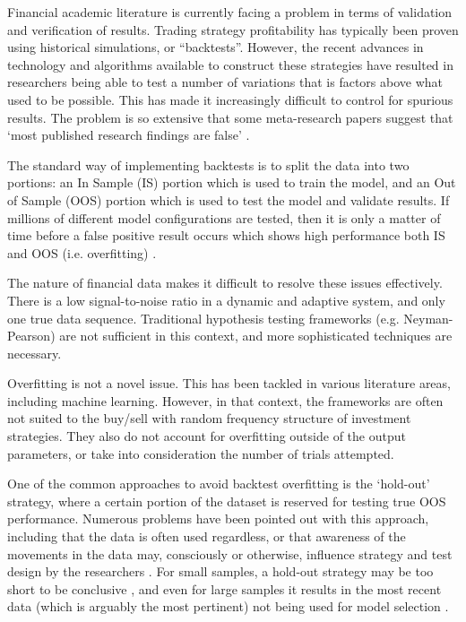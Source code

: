 \documentclass[a4paper,11pt,oneside]{article}
\theoremstyle{plain}
\theoremstyle{definition}
\begin{document}
	Financial academic literature is currently facing a problem in terms of validation and verification of results. 
	Trading strategy profitability has typically been proven using historical simulations, or 
	``backtests''. However, 
	the recent advances in technology and algorithms available 
	to construct these strategies have resulted in researchers being able to test a number of variations that is factors 
	above what used to be possible. This has made it increasingly difficult to control for spurious results. 
	The problem is so extensive that some meta-research papers suggest that ‘most published research findings are false’ \citep{Ioannidis}.
	\hfill \break 
	
	The standard way of implementing backtests is to split the data into two portions: an In Sample (IS) portion which
	is used to train the model, and an Out of Sample (OOS) portion which is used to test the model and validate results. 
	If millions of different model configurations are tested, then it is only a matter of time before a false positive result occurs which shows high performance both IS and OOS (i.e. overfitting) \citep{BailyPBO, McLean}. 
	\hfill \break 
	
	The nature of financial data makes it difficult to resolve these issues effectively. There is a low signal-to-noise ratio in a dynamic and adaptive system, and 
	only one true data sequence. Traditional hypothesis testing frameworks (e.g. Neyman-Pearson) are not sufficient in this context, and more sophisticated techniques are necessary.
	\hfill \break 
	
	Overfitting is not a novel issue. This has been tackled in various literature areas, including machine learning. 
	However, in that context, the frameworks are often not suited to the buy/sell with random frequency structure of 
	investment strategies. They also do not account for overfitting outside of the output parameters, or take into 
	consideration the number of trials attempted.
	
	\hfill \break 	
	One of the common approaches to avoid backtest overfitting is the ‘hold-out’ strategy, where a certain portion of 
	the dataset is reserved for testing true OOS performance. Numerous problems have been pointed out with this 
	approach, including that the data is often used regardless, or that awareness of the movements in the data may, 
	consciously or otherwise, influence strategy and test design by the researchers \citep{Schorfheide}. For small samples, 
	a hold-out strategy may be too short to be conclusive \citep{Weiss}, and even for large samples it results in the 
	most recent data (which is arguably the most pertinent) not being used for model selection \citep{Hawkins, BailyPBO}.
	\hfill \break 
	
\end{document}
